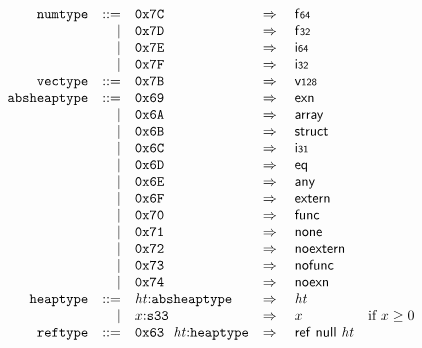 \vspace{1ex}

$$
\begin{array}[t]{@{}lrrl@{}l@{}l@{}l@{}}
& {\mathtt{numtype}} & ::= & \mathtt{0x7C} & \quad\Rightarrow\quad{} & \mathsf{f{\scriptstyle 64}} \\
& & | & \mathtt{0x7D} & \quad\Rightarrow\quad{} & \mathsf{f{\scriptstyle 32}} \\
& & | & \mathtt{0x7E} & \quad\Rightarrow\quad{} & \mathsf{i{\scriptstyle 64}} \\
& & | & \mathtt{0x7F} & \quad\Rightarrow\quad{} & \mathsf{i{\scriptstyle 32}} \\
& {\mathtt{vectype}} & ::= & \mathtt{0x7B} & \quad\Rightarrow\quad{} & \mathsf{v{\scriptstyle 128}} \\
& {\mathtt{absheaptype}} & ::= & \mathtt{0x69} & \quad\Rightarrow\quad{} & \mathsf{exn} \\
& & | & \mathtt{0x6A} & \quad\Rightarrow\quad{} & \mathsf{array} \\
& & | & \mathtt{0x6B} & \quad\Rightarrow\quad{} & \mathsf{struct} \\
& & | & \mathtt{0x6C} & \quad\Rightarrow\quad{} & \mathsf{i{\scriptstyle 31}} \\
& & | & \mathtt{0x6D} & \quad\Rightarrow\quad{} & \mathsf{eq} \\
& & | & \mathtt{0x6E} & \quad\Rightarrow\quad{} & \mathsf{any} \\
& & | & \mathtt{0x6F} & \quad\Rightarrow\quad{} & \mathsf{extern} \\
& & | & \mathtt{0x70} & \quad\Rightarrow\quad{} & \mathsf{func} \\
& & | & \mathtt{0x71} & \quad\Rightarrow\quad{} & \mathsf{none} \\
& & | & \mathtt{0x72} & \quad\Rightarrow\quad{} & \mathsf{noextern} \\
& & | & \mathtt{0x73} & \quad\Rightarrow\quad{} & \mathsf{nofunc} \\
& & | & \mathtt{0x74} & \quad\Rightarrow\quad{} & \mathsf{noexn} \\
& {\mathtt{heaptype}} & ::= & {\mathit{ht}}{:}{\mathtt{absheaptype}} & \quad\Rightarrow\quad{} & {\mathit{ht}} \\
& & | & x{:}{\mathtt{s33}} & \quad\Rightarrow\quad{} & x & \quad \mbox{if}~ x \geq 0 \\
& {\mathtt{reftype}} & ::= & \mathtt{0x63}~~{\mathit{ht}}{:}{\mathtt{heaptype}} & \quad\Rightarrow\quad{} & \mathsf{ref}~\mathsf{null}~{\mathit{ht}} \\

\end{array}$$
